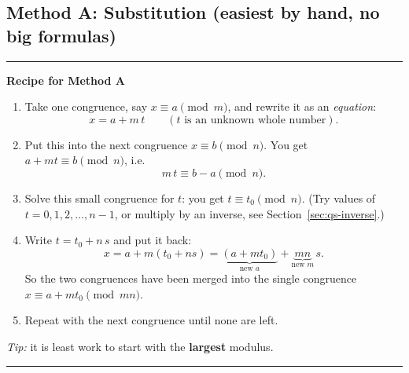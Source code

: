 \documentclass[11pt]{article}
\theoremstyle{definition}
\theoremstyle{remark}
\newenvironment{recipe}[1]{\par\medskip\noindent\begin{minipage}{\linewidth}\noindent\rule{\linewidth}{0.8pt}\par\smallskip\noindent\textbf{#1}\par\smallskip}{\par\noindent\rule{\linewidth}{0.8pt}\end{minipage}\par\medskip}
\begin{document}
\subsection{Method A: Substitution (easiest by hand, no big formulas)}

\begin{recipe}{Recipe for Method A}
\begin{enumerate}[leftmargin=1.6em,itemsep=2pt]
\item Take one congruence, say $x\equiv a \pmod m$, and rewrite it as an \emph{equation}:
\[ x = a + m\,t \qquad (t \text{ is an unknown whole number}). \]
\item Put this into the next congruence $x\equiv b\pmod n$. You get $a+mt\equiv b \pmod n$, i.e.\ 
\[ m\,t\equiv b-a \pmod n. \]
\item Solve this small congruence for $t$: you get $t\equiv t_0\pmod n$. (Try values of $t=0,1,2,\dots,n-1$, or multiply by an inverse, see Section~\ref{sec:qs-inverse}.)
\item Write $t=t_0+n\,s$ and put it back: 
\[ x = a+m(t_0+ns) = \underbrace{(a+mt_0)}_{\text{new } a}+\underbrace{mn}_{\text{new } m}\, s. \]
So the two congruences have been merged into the single congruence $x\equiv a+mt_0\pmod{mn}$.
\item Repeat with the next congruence until none are left.
\end{enumerate}
\emph{Tip:} it is least work to start with the \textbf{largest} modulus.
\end{recipe}
\end{document}
